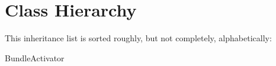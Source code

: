 \section{Class Hierarchy}
This inheritance list is sorted roughly, but not completely, alphabetically\+:\begin{DoxyCompactList}
\item Bundle\+Activator\begin{DoxyCompactList}
\item {}
\end{DoxyCompactList}
\end{DoxyCompactList}
